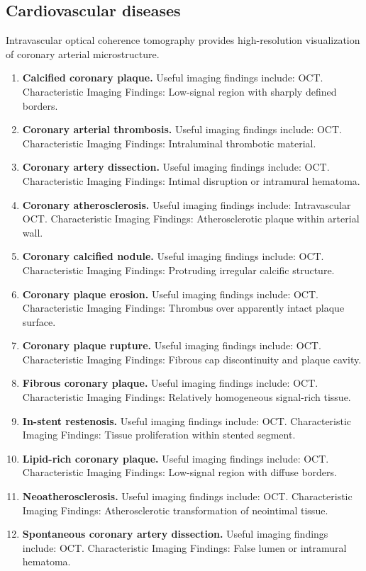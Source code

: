 \subsection{Cardiovascular diseases}
Intravascular optical coherence tomography provides high-resolution visualization of coronary arterial microstructure.
\begin{enumerate}[leftmargin=*,itemsep=0.45em,topsep=0.4em]
\item \textbf{Calcified coronary plaque.} Useful imaging findings include: OCT. Characteristic Imaging Findings: Low-signal region with sharply defined borders.
\item \textbf{Coronary arterial thrombosis.} Useful imaging findings include: OCT. Characteristic Imaging Findings: Intraluminal thrombotic material.
\item \textbf{Coronary artery dissection.} Useful imaging findings include: OCT. Characteristic Imaging Findings: Intimal disruption or intramural hematoma.
\item \textbf{Coronary atherosclerosis.} Useful imaging findings include: Intravascular OCT. Characteristic Imaging Findings: Atherosclerotic plaque within arterial wall.
\item \textbf{Coronary calcified nodule.} Useful imaging findings include: OCT. Characteristic Imaging Findings: Protruding irregular calcific structure.
\item \textbf{Coronary plaque erosion.} Useful imaging findings include: OCT. Characteristic Imaging Findings: Thrombus over apparently intact plaque surface.
\item \textbf{Coronary plaque rupture.} Useful imaging findings include: OCT. Characteristic Imaging Findings: Fibrous cap discontinuity and plaque cavity.
\item \textbf{Fibrous coronary plaque.} Useful imaging findings include: OCT. Characteristic Imaging Findings: Relatively homogeneous signal-rich tissue.
\item \textbf{In-stent restenosis.} Useful imaging findings include: OCT. Characteristic Imaging Findings: Tissue proliferation within stented segment.
\item \textbf{Lipid-rich coronary plaque.} Useful imaging findings include: OCT. Characteristic Imaging Findings: Low-signal region with diffuse borders.
\item \textbf{Neoatherosclerosis.} Useful imaging findings include: OCT. Characteristic Imaging Findings: Atherosclerotic transformation of neointimal tissue.
\item \textbf{Spontaneous coronary artery dissection.} Useful imaging findings include: OCT. Characteristic Imaging Findings: False lumen or intramural hematoma.

\end{enumerate}
